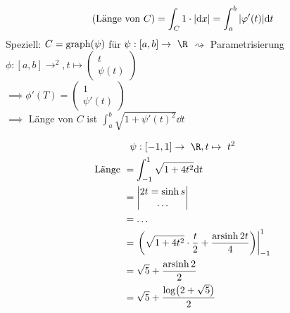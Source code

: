 \begin{bsp*}[note = Kurvenlänge]
	\[ (\text{Länge von $C$}) = \int_C 1 \cdot \abs{\dd x} = \int_a^b \abs{\varphi'(t)} \dd t \]
	Speziell: $C = \operatorname{graph}(\psi)$ für $\psi : [a,b] \rightarrow \R$
	$\rightsquigarrow$ Parametrisierung $\phi : [a,b] \rightarrow^2 , t \mapsto \begin{pmatrix} t \\ \psi(t) \end{pmatrix}$ \\
	$\implies \phi'(T) = \begin{pmatrix} 1 \\ \psi'(t) \end{pmatrix}$ \\
	$\implies$ Länge von $C$ ist $\int_a^b \sqrt{1 + \psi'(t)^2} \dd t$
\end{bsp*}
\begin{bsp*}[note = Länge einer Parabel]
	\begin{gather*}
		\psi : [-1,1] \rightarrow \R , t \mapsto t^2 \\
		\begin{split}
			\text{Länge }
				&= \int_{-1}^1 \sqrt{1 + 4t^2} \dd t \\
				&= \begin{vmatrix*}[c] 2t = \sinh s \\ \dots \end{vmatrix*} \\
				&= \dots \\
				&= \left. \left( \sqrt{1 + 4t^2} \cdot \frac{t}{2} + \frac{\arsinh 2t}{4} \right) \right|_{-1}^1 \\
				&= \sqrt{5} + \frac{\arsinh 2}{2} \\ 
				&= \sqrt{5} + \frac{\log(2 + \sqrt{5})}{2}
		\end{split}
	\end{gather*}
\end{bsp*}

